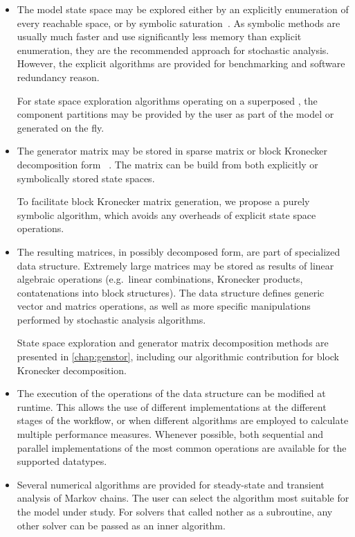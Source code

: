 \begin{itemize}
\item The model state space may be explored either by an explicitly
  enumeration of every reachable space, or by symbolic
  saturation~\citep{Ciardo:2006}. As symbolic methods are usually much
  faster and use significantly less memory than explicit enumeration,
  they are the recommended approach for stochastic analysis. However,
  the explicit algorithms are provided for benchmarking and software
  redundancy reason.

  For state space exploration algorithms operating on a superposed
  , the component partitions may be provided by the user
  as part of the model or generated on the fly.
\item The generator matrix may be stored in sparse matrix or block
  Kronecker decomposition form%
  ~\citep{DBLP:journals/sigmetrics/BuchholzK98}. The matrix can be
  build from both explicitly or symbolically stored state spaces.

  To facilitate block Kronecker matrix generation, we propose a purely
  symbolic algorithm, which avoids any overheads of explicit state
  space operations.
\item The resulting matrices, in possibly decomposed form, are part of
  specialized data structure. Extremely large matrices may be stored
  as results of linear algebraic operations (e.g.~linear combinations,
  Kronecker products, contatenations into block structures). The data
  structure defines generic vector and matrics operations, as well as
  more specific manipulations performed by stochastic analysis
  algorithms.

  State space exploration and generator matrix decomposition methods
  are presented in \cref{chap:genstor}, including our algorithmic
  contribution for block Kronecker decomposition.
\item The execution of the operations of the data structure can be
  modified at runtime. This allows the use of different
  implementations at the different stages of the workflow, or when
  different algorithms are employed to calculate multiple performance
  measures. Whenever possible, both sequential and parallel
  implementations of the most common operations are available for the
  supported datatypes.
\item Several numerical algorithms are provided for steady-state and
  transient analysis of Markov chains. The user can select the
  algorithm most suitable for the model under study. For solvers that
  called nother as a subroutine, any other solver can be passed as an
  inner algorithm.


\end{itemize}
